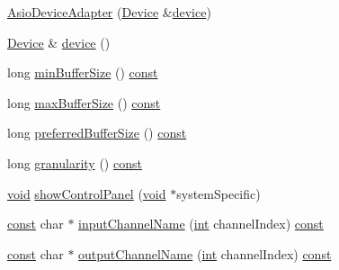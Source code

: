 \begin{DoxyCompactItemize}
\item 
\hyperlink{classportaudio_1_1_asio_device_adapter_ab30f3df69909b27b1dd0e1fa830bdc36}{Asio\+Device\+Adapter} (\hyperlink{classportaudio_1_1_device}{Device} \&\hyperlink{classportaudio_1_1_asio_device_adapter_afcaa2c9e543033fd49561b4e594b7e40}{device})
\item 
\hyperlink{classportaudio_1_1_device}{Device} \& \hyperlink{classportaudio_1_1_asio_device_adapter_afcaa2c9e543033fd49561b4e594b7e40}{device} ()
\item 
long \hyperlink{classportaudio_1_1_asio_device_adapter_a2a2792041b09c59ce4b567b9ecc986d1}{min\+Buffer\+Size} () \hyperlink{getopt1_8c_a2c212835823e3c54a8ab6d95c652660e}{const} 
\item 
long \hyperlink{classportaudio_1_1_asio_device_adapter_a828bbaeb126f04f688a782d4d6887a23}{max\+Buffer\+Size} () \hyperlink{getopt1_8c_a2c212835823e3c54a8ab6d95c652660e}{const} 
\item 
long \hyperlink{classportaudio_1_1_asio_device_adapter_a7c6e86f9102e59b02de5459bc5e1ac4d}{preferred\+Buffer\+Size} () \hyperlink{getopt1_8c_a2c212835823e3c54a8ab6d95c652660e}{const} 
\item 
long \hyperlink{classportaudio_1_1_asio_device_adapter_ae3b9d5fb838e4624126bfe7d9d0d5cb7}{granularity} () \hyperlink{getopt1_8c_a2c212835823e3c54a8ab6d95c652660e}{const} 
\item 
\hyperlink{sound_8c_ae35f5844602719cf66324f4de2a658b3}{void} \hyperlink{classportaudio_1_1_asio_device_adapter_a4ed805775f2e002409f00ffe94808188}{show\+Control\+Panel} (\hyperlink{sound_8c_ae35f5844602719cf66324f4de2a658b3}{void} $\ast$system\+Specific)
\item 
\hyperlink{getopt1_8c_a2c212835823e3c54a8ab6d95c652660e}{const} char $\ast$ \hyperlink{classportaudio_1_1_asio_device_adapter_ab1b639de4245fe3bbf9ed3158d7966c0}{input\+Channel\+Name} (\hyperlink{xmltok_8h_a5a0d4a5641ce434f1d23533f2b2e6653}{int} channel\+Index) \hyperlink{getopt1_8c_a2c212835823e3c54a8ab6d95c652660e}{const} 
\item 
\hyperlink{getopt1_8c_a2c212835823e3c54a8ab6d95c652660e}{const} char $\ast$ \hyperlink{classportaudio_1_1_asio_device_adapter_a7c965c15c939f3daf96a524ba870c551}{output\+Channel\+Name} (\hyperlink{xmltok_8h_a5a0d4a5641ce434f1d23533f2b2e6653}{int} channel\+Index) \hyperlink{getopt1_8c_a2c212835823e3c54a8ab6d95c652660e}{const} 
\end{DoxyCompactItemize}


